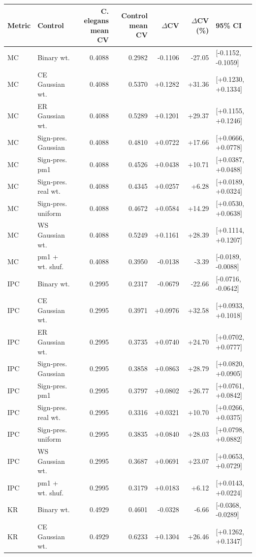 \begin{tabular}{llrrrrl}
\toprule
Metric & Control & C. elegans mean CV & Control mean CV & $\Delta$CV & $\Delta$CV (\%) & 95\% CI \\
\midrule
MC & Binary wt. & 0.4088 & 0.2982 & -0.1106 & -27.05 & [-0.1152, -0.1059] \\
MC & CE Gaussian wt. & 0.4088 & 0.5370 & +0.1282 & +31.36 & [+0.1230, +0.1334] \\
MC & ER Gaussian wt. & 0.4088 & 0.5289 & +0.1201 & +29.37 & [+0.1155, +0.1246] \\
MC & Sign-pres. Gaussian & 0.4088 & 0.4810 & +0.0722 & +17.66 & [+0.0666, +0.0778] \\
MC & Sign-pres. pm1 & 0.4088 & 0.4526 & +0.0438 & +10.71 & [+0.0387, +0.0488] \\
MC & Sign-pres. real wt. & 0.4088 & 0.4345 & +0.0257 & +6.28 & [+0.0189, +0.0324] \\
MC & Sign-pres. uniform & 0.4088 & 0.4672 & +0.0584 & +14.29 & [+0.0530, +0.0638] \\
MC & WS Gaussian wt. & 0.4088 & 0.5249 & +0.1161 & +28.39 & [+0.1114, +0.1207] \\
MC & pm1 + wt. shuf. & 0.4088 & 0.3950 & -0.0138 & -3.39 & [-0.0189, -0.0088] \\
IPC & Binary wt. & 0.2995 & 0.2317 & -0.0679 & -22.66 & [-0.0716, -0.0642] \\
IPC & CE Gaussian wt. & 0.2995 & 0.3971 & +0.0976 & +32.58 & [+0.0933, +0.1018] \\
IPC & ER Gaussian wt. & 0.2995 & 0.3735 & +0.0740 & +24.70 & [+0.0702, +0.0777] \\
IPC & Sign-pres. Gaussian & 0.2995 & 0.3858 & +0.0863 & +28.79 & [+0.0820, +0.0905] \\
IPC & Sign-pres. pm1 & 0.2995 & 0.3797 & +0.0802 & +26.77 & [+0.0761, +0.0842] \\
IPC & Sign-pres. real wt. & 0.2995 & 0.3316 & +0.0321 & +10.70 & [+0.0266, +0.0375] \\
IPC & Sign-pres. uniform & 0.2995 & 0.3835 & +0.0840 & +28.03 & [+0.0798, +0.0882] \\
IPC & WS Gaussian wt. & 0.2995 & 0.3687 & +0.0691 & +23.07 & [+0.0653, +0.0729] \\
IPC & pm1 + wt. shuf. & 0.2995 & 0.3179 & +0.0183 & +6.12 & [+0.0143, +0.0224] \\
KR & Binary wt. & 0.4929 & 0.4601 & -0.0328 & -6.66 & [-0.0368, -0.0289] \\
KR & CE Gaussian wt. & 0.4929 & 0.6233 & +0.1304 & +26.46 & [+0.1262, +0.1347] \\

\end{tabular}
